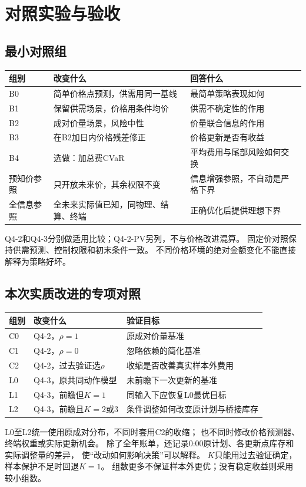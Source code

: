 \documentclass[UTF8,11pt]{ctexart}
\begin{document}
\clearpage
\section{对照实验与验收}
\subsection{最小对照组}
\begin{longtable}{p{2.1cm}p{6.2cm}p{5.5cm}}
\toprule 组别 & 改变什么 & 回答什么\\ \midrule
\endhead
B0 & 简单价格点预测，供需用同一基线 & 最简单策略表现如何\\
B1 & 保留供需场景，价格用条件均价 & 供需不确定性的作用\\
B2 & 成对价量场景，风险中性 & 价量联合信息的作用\\
B3 & 在B2加日内价格残差修正 & 价格更新是否有收益\\
B4 & 选做：加总费CVaR & 平均费用与尾部风险如何交换\\
预知价参照 & 只开放未来价，其余权限不变 & 信息增强参照，不自动是严格下界\\
全信息参照 & 全未来实际值已知，同物理、结算、终端 & 正确优化后提供理想下界\\
\bottomrule
\end{longtable}
Q4-2和Q4-3分别做适用比较；Q4-2-PV另列，不与价格改进混算。
固定价对照保持供需预测、控制权限和初末条件一致。
不同价格环境的绝对金额变化不能直接解释为策略好坏。

\subsection{本次实质改进的专项对照}
\begin{longtable}{p{2.1cm}p{6.2cm}p{5.5cm}}
\toprule 组别 & 改变什么 & 验证目标\\ \midrule
\endhead
C0 & Q4-2，$\rho=1$ & 原成对价量基准\\
C1 & Q4-2，$\rho=0$ & 忽略依赖的简化基准\\
C2 & Q4-2，过去验证选$\rho$ & 收缩是否改善真实样本外费用\\
L0 & Q4-3，原共同动作模型 & 未前瞻下一次更新的基准\\
L1 & Q4-3，前瞻但$K=1$ & 同输入下应恢复L0最优目标\\
L2 & Q4-3，前瞻且$K=2$或3 & 条件调整如何改变原计划与桥接库存\\
\bottomrule
\end{longtable}
L0至L2统一使用原成对分布，不同时套用C2的收缩；
也不同时修改价格预测器、终端权重或实际更新机会。
除了全年账单，还记录0:00原计划、各更新点库存和实际调整量的差异，
使“改动如何影响决策”可以解释。
$K$只能用过去验证确定，样本保护不足时回退$K=1$。
组数更多不保证样本外更优；没有稳定收益则采用较小组数。
\end{document}
